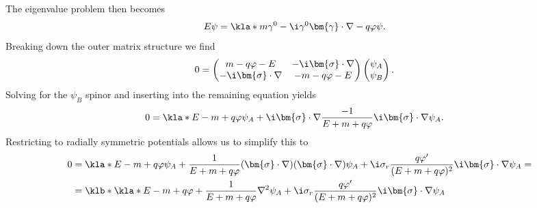 \documentclass[english, parskip=full]{scrartcl}
\begin{document}
The eigenvalue problem then becomes
\begin{align}
E\psi &= \kla*{m\gamma^0 - \i \gamma^0 \bm{\gamma} \cdot \nabla - q\varphi} \psi.
\end{align}
Breaking down the outer matrix structure we find
\begin{align}
0 &= \begin{pmatrix}
m - q\varphi - E & -\i\bm{\sigma} \cdot \nabla \\ -\i\bm{\sigma} \cdot \nabla & -m - q\varphi - E
\end{pmatrix} \begin{pmatrix}
\psi_A \\ \psi_B
\end{pmatrix}.
\end{align}
Solving for the $\psi_B$ spinor and inserting into the remaining equation yields
\begin{align}
0 &= \kla*{E-m+q\varphi} \psi_A + \i \bm{\sigma} \cdot \nabla \frac{-1}{E+m+q\varphi} \i\bm{\sigma}\cdot\nabla \psi_A.
\end{align}
Restricting to radially symmetric potentials allows us to simplify this to
\begin{align}
0 &= \kla*{E-m+q\varphi} \psi_A + \frac{1}{E+m+q\varphi} (\bm{\sigma} \cdot \nabla) (\bm{\sigma}\cdot\nabla) \psi_A + \i\sigma_r \frac{q\varphi'}{(E+m+q\varphi)^2} \i\bm{\sigma}\cdot\nabla \psi_A = \\
&= \klb*{\kla*{E-m+q\varphi} + \frac{1}{E+m+q\varphi} \nabla^2} \psi_A + \i\sigma_r \frac{q\varphi'}{(E+m+q\varphi)^2} \i\bm{\sigma}\cdot\nabla \psi_A
\end{align}

\end{document}
